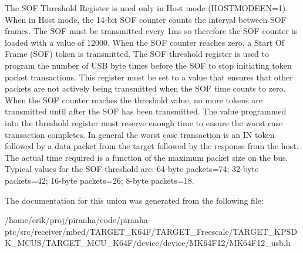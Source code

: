 The S\+OF Threshold Register is used only in Host mode (H\+O\+S\+T\+M\+O\+D\+E\+EN=1). When in Host mode, the 14-\/bit S\+OF counter counts the interval between S\+OF frames. The S\+OF must be transmitted every 1ms so therefore the S\+OF counter is loaded with a value of 12000. When the S\+OF counter reaches zero, a Start Of Frame (S\+OF) token is transmitted. The S\+OF threshold register is used to program the number of U\+SB byte times before the S\+OF to stop initiating token packet transactions. This register must be set to a value that ensures that other packets are not actively being transmitted when the S\+OF time counts to zero. When the S\+OF counter reaches the threshold value, no more tokens are transmitted until after the S\+OF has been transmitted. The value programmed into the threshold register must reserve enough time to ensure the worst case transaction completes. In general the worst case transaction is an IN token followed by a data packet from the target followed by the response from the host. The actual time required is a function of the maximum packet size on the bus. Typical values for the S\+OF threshold are\+: 64-\/byte packets=74; 32-\/byte packets=42; 16-\/byte packets=26; 8-\/byte packets=18. 

The documentation for this union was generated from the following file\+:\begin{DoxyCompactItemize}
\item 
/home/erik/proj/piranha/code/piranha-\/ptc/src/receiver/mbed/\+T\+A\+R\+G\+E\+T\+\_\+\+K64\+F/\+T\+A\+R\+G\+E\+T\+\_\+\+Freescale/\+T\+A\+R\+G\+E\+T\+\_\+\+K\+P\+S\+D\+K\+\_\+\+M\+C\+U\+S/\+T\+A\+R\+G\+E\+T\+\_\+\+M\+C\+U\+\_\+\+K64\+F/device/device/\+M\+K64\+F12/M\+K64\+F12\+\_\+usb.\+h\end{DoxyCompactItemize}
